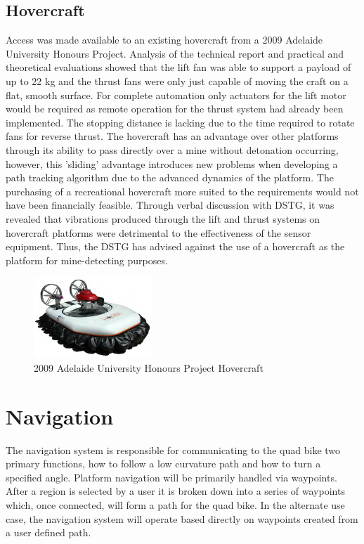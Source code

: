 \documentclass[main.tex]{subfiles}
\begin{document}
\subsection{Hovercraft}
Access was made available to an existing hovercraft from a 2009 Adelaide University Honours Project. Analysis of the technical report \parencite{hovercraft2009} and practical and theoretical evaluations showed that the lift fan was able to support a payload of up to 22 kg and the thrust fans were only just capable of moving the craft on a flat, smooth surface. For complete automation only actuators for the lift motor would be required as remote operation for the thrust system had already been implemented. The stopping distance is lacking due to the time required to rotate fans for reverse thrust. The hovercraft has an advantage over other platforms through its ability to pass directly over a mine without detonation occurring, however, this 'sliding' advantage introduces new problems when developing a path tracking algorithm due to the advanced dynamics of the platform. The purchasing of a recreational hovercraft more suited to the requirements would not have been financially feasible. Through verbal discussion with DSTG, it was revealed that vibrations produced through the lift and thrust systems on hovercraft platforms were detrimental to the effectiveness of the sensor equipment. Thus, the DSTG has advised against the use of a hovercraft as the platform for mine-detecting purposes.
\begin{figure}[ht]
\includegraphics[width=0.4\textwidth]{4-ConceptDesign/HovercraftPic.png}
\centering
\caption[2009 Adelaide University Honours Project Hovercraft]{2009 Adelaide University Honours Project Hovercraft \parencite{hovercraft2009}} 
\end{figure}

\section{Navigation}
The navigation system is responsible for communicating to the quad bike two primary functions, how to follow a low curvature path and how to turn a specified angle. Platform navigation will be primarily handled via waypoints. After a region is selected by a user it is broken down into a series of waypoints which, once connected, will form a path for the quad bike. In the alternate use case, the navigation system will operate based directly on waypoints created from a user defined path.
\end{document}
